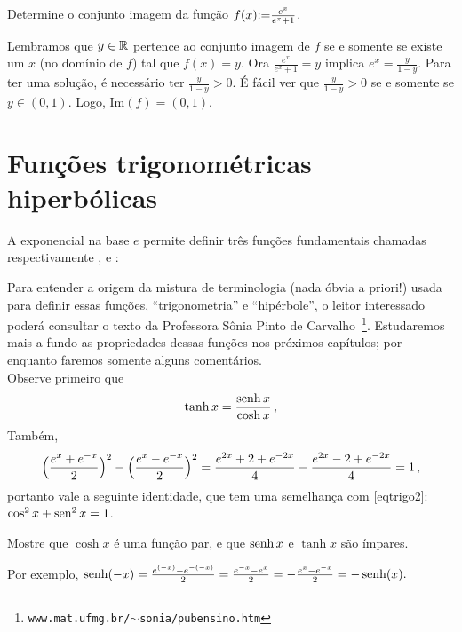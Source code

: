 \begin{exo}
Determine o conjunto imagem da função $f(x){:=}
\frac{e^{x}}{e^{x}+1}$.
\begin{sol}
Lembramos que $y\in \mathbb{R}$ pertence ao conjunto imagem de $f$ se e somente
se existe um $x$ (no domínio de $f$) tal que $f(x)=y$.
Ora $\frac{e^{x}}{e^{x}+1}=y$ implica $e^x=\frac{y}{1-y}$. Para ter uma
solução, é necessário ter $\frac{y}{1-y}>0$. É fácil ver que
$\frac{y}{1-y}>0$ se e somente se $y\in (0,1)$. Logo, 
$\mathrm{Im}(f)=(0,1)$. 
\end{sol}
\end{exo}

\section[Funções hiperbólicas]{Funções trigonométricas hiperbólicas}\label{Sec:FuncTrigHiperb}
A exponencial na base $e$ 
permite definir três funções fundamentais chamadas respectivamente 
,  e :

Para entender a origem da mistura de terminologia (nada óbvia a priori!) 
usada para definir essas funções, ``trigonometria'' e 
``hipérbole'', o leitor
interessado poderá consultar o texto da Professora Sônia Pinto de
Carvalho~\footnote{\texttt{www.mat.ufmg.br/$\sim$sonia/pubensino.htm}}.
Estudaremos mais a fundo as propriedades dessas funções nos próximos 
capítulos; por enquanto faremos somente alguns comentários.\\

Observe primeiro que
$$\tanh x=\frac{\operatorname{senh} x}{\cosh x}\,, $$
Também,
$$
\Bigl( \frac{e^x+e^{-x}}{2}\Bigr)^2-\Bigl(
\frac{e^x-e^{-x}}{2}\Bigr)^2=\frac{e^{2x}+2+e^{-2x}}{4}-
\frac{e^{2x}-2+e^{-2x}}{4}=1\,,
$$
portanto vale a seguinte identidade,
que tem uma semelhança com \eqref{eqtrigo2}: $\cos^2x +\operatorname{sen}^2x=1$. 

\begin{exo}
Mostre que $\cosh x$ é uma função par, e que $\operatorname{senh} x$ e $\tanh x$ são ímpares.
\begin{sol}
Por exemplo, $\operatorname{senh} (-x)=\frac{e^{(-x)}-e^{-(-x)}}{2}=\frac{e^{-x}-e^{x}}{2}
=-\frac{e^{x}-e^{-x}}{2}=-\operatorname{senh} (x).$
\end{sol}
\end{exo}

